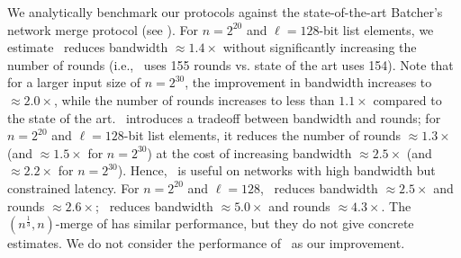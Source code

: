 \noindent We analytically benchmark our protocols against the state-of-the-art Batcher's network merge protocol (see ). For $n=2^{20}$ and $\ell=128$-bit list elements, we estimate \ourapproach\ reduces bandwidth $\approx1.4\times$ without significantly increasing the number of rounds (i.e., \ourprotocol\ uses 155 rounds vs. state of the art uses 154). Note that for a larger input size of $n=2^{30}$, the improvement in bandwidth increases to $\approx2.0\times$, while the number of rounds increases to less than $1.1\times$ compared to the state of the art. \ourapproachtwo\ introduces a tradeoff between bandwidth and rounds; for $n=2^{20}$ and $\ell=128$-bit list elements, it reduces the number of rounds $\approx 1.3\times$ (and $\approx 1.5\times$ for $n=2^{30}$) at the cost of increasing bandwidth $\approx 2.5\times$ (and $\approx 2.2\times$ for $n=2^{30}$). Hence, \ourapproachtwo\ is useful on networks with high bandwidth but constrained latency. %
For $n=2^{20}$ and $\ell=128$, \sqrtmerge\ reduces bandwidth $\approx2.5\times$ and rounds $\approx2.6\times$; \knmerge\ reduces bandwidth $\approx5.0\times$ and rounds $\approx4.3\times$. The $(n^{\frac{1}{3}},n)$-merge of \cite{EPRINT:BBDLO22} has similar performance, but they do not give concrete estimates. We do not consider the performance of \knmerge\ as our improvement. %

